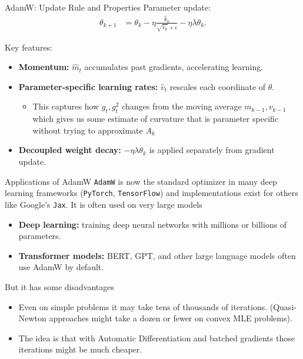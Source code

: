 \begin{frame}{AdamW: Update Rule and Properties}
Parameter update:
\begin{align}
    \theta_{k+1} 
    &= \theta_k 
    - \eta \frac{\hat{k}_k}{\sqrt{\hat{v}_k} + \epsilon}
    - \eta \lambda \theta_k.
\end{align}

Key features:
\begin{itemize}
    \item \textbf{Momentum:} $\hat{m}_t$ accumulates past gradients, accelerating learning.
    \item \textbf{Parameter-specific learning rates:} $\hat{v}_t$ rescales each coordinate of $\theta$.
    \begin{itemize}
    	\item This captures how $g_t,g_t^2$ changes from the moving average $m_{k-1},v_{k-1}$ which gives us some estimate of curvature that is parameter specific without trying to approximate $A_k$
    \end{itemize}
    \item \textbf{Decoupled weight decay:} $-\eta \lambda \theta_k$ is applied separately from gradient update.
\end{itemize}
\end{frame}

\begin{frame}{Applications of AdamW}
\texttt{AdamW} is now the standard optimizer in many deep learning frameworks (\texttt{PyTorch}, \texttt{TensorFlow}) and implementations exist for others like Google's \texttt{Jax}. It is often used on very large models
\begin{itemize}
    \item \textbf{Deep learning:} training deep neural networks with millions or billions of parameters.
    \item \textbf{Transformer models:} BERT, GPT, and other large language models often use AdamW by default.
\end{itemize}
But it has some disadvantages
\begin{itemize}
	\item Even on simple problems it may take tens of thousands of iterations. (Quasi-Newton approaches might take a dozen or fewer on convex MLE problems).
	\item The idea is that with \alert{Automatic Differentiation} and \alert{batched gradients} those iterations might be much cheaper.
\end{itemize}



\vspace{0.3cm}
\centering
\end{frame}






